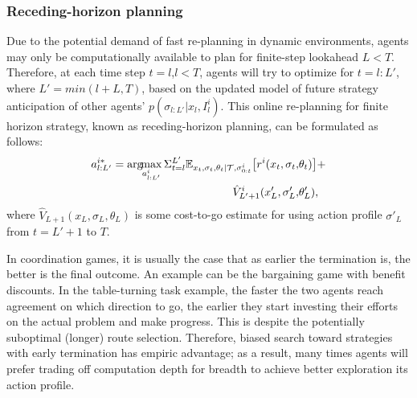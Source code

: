 \documentclass[letterpaper, 10 pt, conference]{ieeeconf}  %
\newcommand{\argmax}{\arg\!\!\max}
\begin{document}
\subsubsection{Receding-horizon planning}\label{sec:receding}
Due to the potential demand of fast re-planning in dynamic environments, agents may only be computationally available to plan for finite-step lookahead $L<T$. Therefore, at each time step $t=l$,$l<T$, agents will try to optimize for $t=l:L'$, where $L'=min(l+L,T)$, based on the updated model of future strategy anticipation of other agents' $p(\sigma_{l:L'}|x_l,I^i_l)$. This online re-planning 
for finite horizon strategy, known as receding-horizon planning, can be formulated as follows:
\begin{equation}
  \begin{aligned}
  a^{i*}_{l:L'} = \argmax_{a^i_{l:L'}} 
  \Sigma_{t=l}^{L'} 
  \mathbb{E}_{x_t,\sigma_{t},\theta_t|\mathcal{T},\sigma^i_{0:t}} \big{[}
    r^i(x_t,\sigma_t,&\theta_t)\big{]}+ \\
    \hat{V}^i_{L'+1}(x_L',\sigma_L',&\theta_L'), 
  \end{aligned}
  \end{equation}
where $\hat{V}_{L+1}(x_L,\sigma_L,\theta_L)$ is some cost-to-go estimate for using action profile $\sigma'_L$ from $t=L'+1$ to $T$.

In coordination games, it is usually the case that as earlier the termination is, the better is the final outcome. An example can be the bargaining game with benefit discounts. 
In the table-turning task example, the faster the two agents reach 
agreement on which direction to go, the earlier they start investing their efforts on the actual problem and make progress. This is despite the 
potentially suboptimal (longer) route selection. Therefore, biased search toward strategies with early termination has empiric advantage; as a result, many times agents will prefer trading off computation depth for breadth to achieve better exploration its action profile. 
\end{document}
